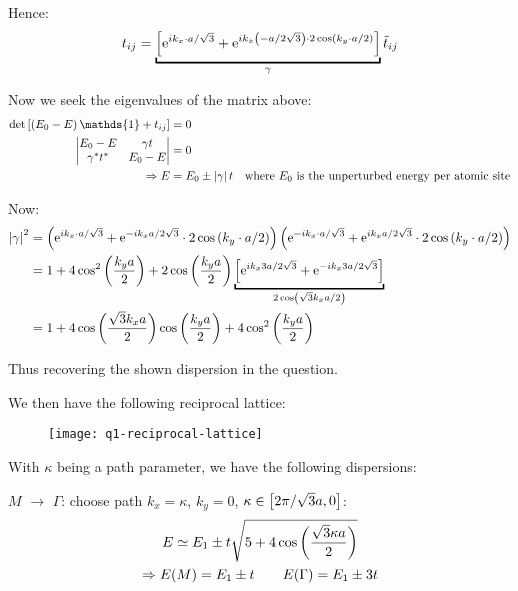 \begin{parts}
	Hence:
	\begin{equation*}
		t_{ij} = \underbracket{\sbracket{\mathrm{e}^{ik_x \cdot a/\sqrt{3}} + \mathrm{e}^{ik_x \rbracket{-a/2\sqrt{3}} \cdot 2\cos\rbracket{k_y \cdot a/2}}}}_{\gamma} \tilde{t}_{ij}
	\end{equation*}
	
	Now we seek the eigenvalues of the matrix above:
	\begin{align*}
		\textnormal{det}\sbracket{\rbracket{E_0 - E}\mathds{1} + t_{ij}} &= 0 \\
		\begin{vmatrix}
			E_0 - E & \gamma t \\
			\gamma^* t^* & E_0 - E
		\end{vmatrix} &= 0 \\
		\Rightarrow E &= E_0 \pm \abs{\gamma} t \textnormal{\hspace{1em}where $E_0$ is the unperturbed energy per atomic site}
	\end{align*}
	
	Now:
	\begin{align*}
		\abs{\gamma}^2 &= \rbracket{\mathrm{e}^{ik_x \cdot a/\sqrt{3}} + \mathrm{e}^{-ik_x a/2\sqrt{3}} \cdot 2\cos\rbracket{k_y \cdot a/2}} \rbracket{\mathrm{e}^{-ik_x \cdot a/\sqrt{3}} + \mathrm{e}^{ik_x a/2\sqrt{3}} \cdot 2\cos\rbracket{k_y \cdot a/2}} \\
		&= 1 + 4\cos^2 \rbracket{\frac{k_y a}{2}} + 2\cos\rbracket{\frac{k_y a}{2}} \underbracket{\sbracket{\mathrm{e}^{ik_x 3a/2\sqrt{3}} + \mathrm{e}^{-ik_x 3a/2\sqrt{3}}}}_{2\cos\rbracket{\sqrt{3}k_x a/2}} \\
		&= 1 + 4 \cos\rbracket{\frac{\sqrt{3}k_x a}{2}} \cos\rbracket{\frac{k_y a}{2}} + 4 \cos^2 \rbracket{\frac{k_y a}{2}}
	\end{align*}
	
	Thus recovering the shown dispersion in the question.
	
	We then have the following reciprocal lattice:
	\begin{figure}[H]
		\centering
		\texttt{[image: q1-reciprocal-lattice]}
	\end{figure}
	
	With $\kappa$ being a path parameter, we have the following dispersions:
	
	$M$ $\rightarrow$ $\Gamma$: choose path $k_x = \kappa$, $k_y =0$, $\kappa\in\left[2\pi / \sqrt{3}a, 0\right]$:
	\begin{gather*}
		E \simeq E_1 \pm t \sqrt{5 + 4\cos \left(\frac{\sqrt{3}\kappa a}{2}\right)} \\
		\Rightarrow E(M) = E_1 \pm t \qquad E(\Gamma) = E_1 \pm 3t
	\end{gather*}
	

\end{parts}
